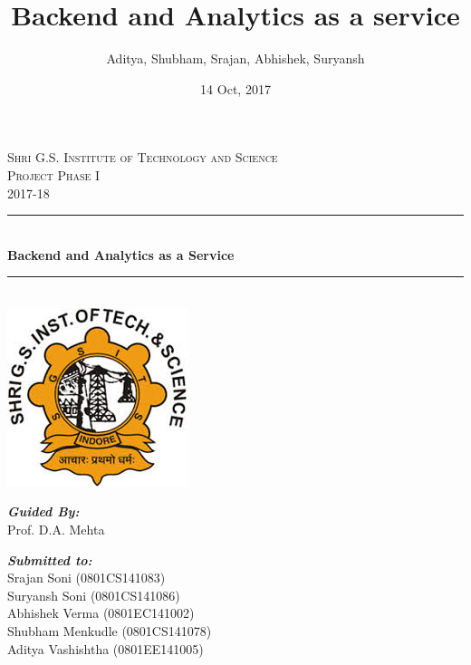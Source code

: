 \documentclass[a4paper,12pt]{report}
\title{Backend and Analytics as a service}
\author{Aditya, Shubham, Srajan, Abhishek, Suryansh}
\date{14 Oct, 2017}
\begin{document}
    
    \begin{titlepage}
      \newcommand{\HRule}{\rule{\linewidth}{0.5mm}} %
      \center
      \textsc{\LARGE Shri G.S. Institute of Technology and Science}\\[1.5cm]
      \textsc{\Large Project Phase I}\\[0.5cm]
      \textsc{\large 2017-18}\\[0.5cm]
      \HRule \\[0.4cm]
      { \huge \bfseries Backend and Analytics as a Service}\\[0.4cm] %
      \HRule \\[1.5cm]
      \includegraphics{logo.jpg}\\[5cm] %
      \begin{minipage}{0.4\textwidth}
      \begin{flushleft} \large
      \textbf{\emph{Guided By:}}\\
      Prof. D.A. Mehta
      \end{flushleft}
      \end{minipage}
      \begin{minipage}{0.4\textwidth}
      \begin{flushright} \normalsize
      \textbf{\emph{Submitted to:}} \\
      Srajan Soni (0801CS141083)\\
      Suryansh Soni (0801CS141086)\\
      Abhishek Verma (0801EC141002)\\
      Shubham Menkudle (0801CS141078)\\
      Aditya Vashishtha (0801EE141005)\\
      
      
         
      \end{flushright}
      \end{minipage}\\[2cm]            
      \vfill       
    \end{titlepage}    
    
\end{document}
